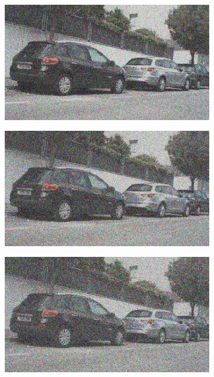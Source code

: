 \documentclass[a4paper]{ctexart}
\begin{document}
\begin{figure}[htbp]
\begin{subfigure}{0.08\textwidth}
				\label{fig：Gamma=0.7, Gauss Noise = 0.4}
			\end{subfigure}
			\begin{subfigure}{0.08\textwidth}
				\captionsetup{font=scriptsize}
				\includegraphics[width=\linewidth]{picture/Edge Detection/degrade/RGB_001 Gamma=0.7, Gauss Noise=0.5}
				\label{fig：Gamma=0.7, Gauss Noise = 0.5}
			\end{subfigure}
			\begin{subfigure}{0.08\textwidth}
				\captionsetup{font=scriptsize}
				\includegraphics[width=\linewidth]{picture/Edge Detection/degrade/RGB_001 Gamma=0.7, Gauss Noise=0.6}
				\label{fig：Gamma=0.7, Gauss Noise = 0.6}
			\end{subfigure}
			\begin{subfigure}{0.08\textwidth}
				\captionsetup{font=scriptsize}
				\includegraphics[width=\linewidth]{picture/Edge Detection/degrade/RGB_001 Gamma=0.7, Gauss Noise=0.7}

\end{subfigure}
\end{figure}
\end{document}
